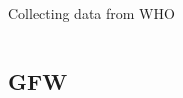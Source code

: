 \documentclass[xcolor=x11names, aspectratio=169, compress]{beamer}
\renewcommand{\(}{\begin{columns}}
\renewcommand{\)}{\end{columns}}
\newcommand{\<}[1]{\begin{column}{#1}}
\renewcommand{\>}{\end{column}}
\begin{document}
\begin{frame}{Collecting data from WHO}
\begin{columns}[T]
\begin{column}{0.8\textwidth}
\begin{center}
\begin{itemize}

   \end{itemize}
    \end{center}
    \end{column}
\end{columns}
\end{frame}

\subsection{GFW}
\end{document}
